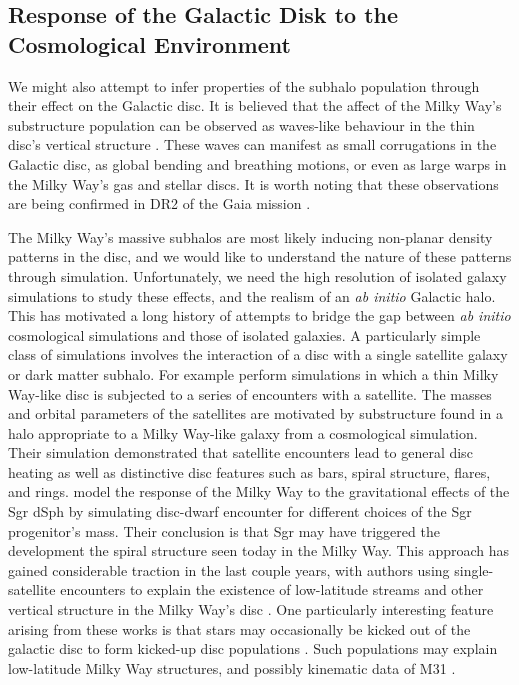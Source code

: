 \subsection{Response of the Galactic Disk to the Cosmological Environment}


We might also attempt to infer properties of the subhalo population through their effect on the Galactic disc.  It is believed that the affect of the Milky Way's substructure population can be observed as waves-like behaviour in the thin disc's vertical structure \citep{widrow_2012_sdss,carlin_2013_lamost, williams_2013_rave,xu_2015, carrillo_2018_rave}.  These waves can manifest as small corrugations in the Galactic disc, as global bending and breathing motions, or even as large warps in the Milky Way's gas  \citep{gasWarp} and stellar discs. It is worth noting that these observations are being confirmed in DR2 of the Gaia mission \citep[for example]{gaia_collab,bennet_2019_gaia}.

The Milky Way's massive subhalos are most likely inducing non-planar density patterns in the disc, and we would like to understand the nature of these patterns through simulation. Unfortunately, we need the high resolution of isolated galaxy simulations to study these effects, and the realism of an \textit{ab initio} Galactic halo.  This has motivated a long history of attempts to bridge the gap between {\it ab initio} cosmological simulations and those of isolated galaxies.  A particularly simple class of simulations involves the interaction of a disc
with a single satellite galaxy or dark matter subhalo.  For example \citet{kazantzidis2008} perform simulations in which a thin Milky Way-like disc is subjected to a series of encounters with a satellite.  The masses and orbital parameters of the satellites are motivated by substructure found in a halo appropriate to a Milky Way-like galaxy from a cosmological simulation.  Their simulation demonstrated that satellite encounters lead to general disc heating as well as distinctive disc features such as bars, spiral structure, flares, and rings.  \citet{purcell2011} model the response of the Milky Way to the gravitational effects of
the Sgr dSph by simulating disc-dwarf encounter for different choices of the Sgr progenitor's mass.  Their conclusion is that Sgr may have triggered the development the spiral structure seen today in the Milky Way.  This approach has gained considerable traction in the last couple years, with authors using single-satellite encounters to explain the existence of low-latitude streams and other vertical structure in the Milky Way's disc \citep[for example]{widrow_2014, dlv_2015, donghia_2016, laporte_2016, laporte_2018}. One particularly interesting feature arising from these works is that stars may occasionally be kicked out of the galactic disc to form kicked-up disc populations \citep{johnston_kud_review, laporte_2019_feathers}. Such populations may explain low-latitude Milky Way structures, and possibly kinematic data of M31 \citep{dorman_2013_m31}.

